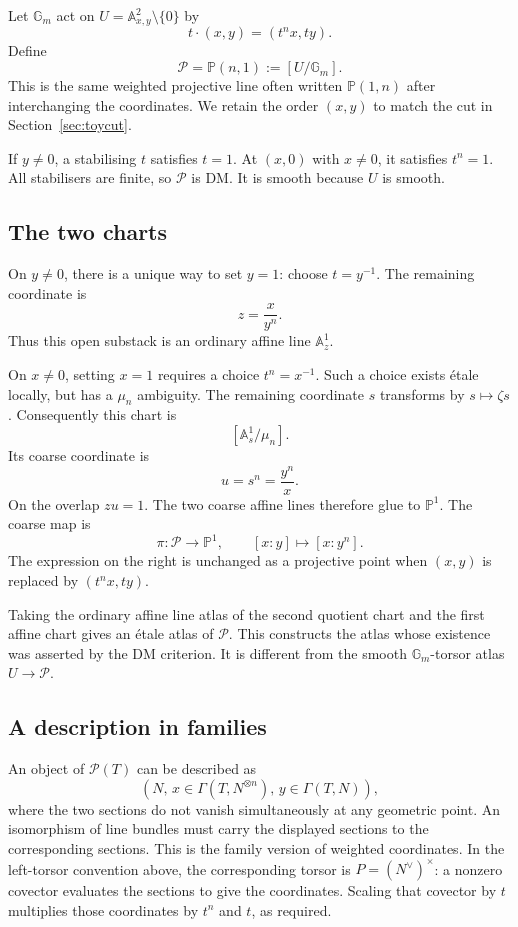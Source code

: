 \documentclass[11pt,a4paper]{article}
\numberwithin{equation}{section}
\theoremstyle{definition}
\newcommand{\A}{\mathbb A}
\newcommand{\PP}{\mathbb P}
\newcommand{\Gm}{\mathbb G_m}
\newcommand{\cP}{\mathcal P}
\begin{document}
Let $\Gm$ act on $U=\A^2_{x,y}\setminus\{0\}$ by
\begin{equation}\label{eq:weightedaction}
 t\cdot(x,y)=(t^n x,t y).
\end{equation}
Define
\[
 \cP=\PP(n,1):=[U/\Gm].
\]
This is the same weighted projective line often written $\PP(1,n)$ after
interchanging the coordinates. We retain the order $(x,y)$ to match the cut
in Section~\ref{sec:toycut}.

If $y\ne0$, a stabilising $t$ satisfies $t=1$. At $(x,0)$ with $x\ne0$,
it satisfies $t^n=1$. All stabilisers are finite, so $\cP$ is DM. It is
smooth because $U$ is smooth.

\subsection{The two charts}
On $y\ne0$, there is a unique way to set $y=1$: choose $t=y^{-1}$. The
remaining coordinate is
\[
 z=\frac{x}{y^n}.
\]
Thus this open substack is an ordinary affine line $\A^1_z$.

On $x\ne0$, setting $x=1$ requires a choice $t^n=x^{-1}$. Such a choice
exists étale locally, but has a $\mu_n$ ambiguity. The remaining coordinate
$s$ transforms by $s\mapsto\zeta s$. Consequently this chart is
\[
 [\A^1_s/\mu_n].
\]
Its coarse coordinate is
\[
 u=s^n=\frac{y^n}{x}.
\]
On the overlap $zu=1$. The two coarse affine lines therefore glue to
$\PP^1$. The coarse map is
\begin{equation}\label{eq:coarseweighted}
 \pi:\cP\longrightarrow\PP^1,\qquad [x:y]\longmapsto[x:y^n].
\end{equation}
The expression on the right is unchanged as a projective point when
$(x,y)$ is replaced by $(t^n x,ty)$.

Taking the ordinary affine line atlas of the second quotient chart and the
first affine chart gives an étale atlas of $\cP$. This constructs the atlas
whose existence was asserted by the DM criterion. It is different from
the smooth $\Gm$-torsor atlas $U\to\cP$.

\subsection{A description in families}
An object of $\cP(T)$ can be described as
\[
 (N,\,x\in\Gamma(T,N^{\otimes n}),\,
        y\in\Gamma(T,N)),
\]
where the two sections do not vanish simultaneously at any geometric point.
An isomorphism of line bundles must carry the displayed sections to the
corresponding sections. This is the family version of weighted coordinates.
In the left-torsor convention above, the corresponding torsor is
$P=(N^\vee)^\times$: a nonzero covector evaluates the sections to give
the coordinates. Scaling that covector by $t$ multiplies those
coordinates by $t^n$ and $t$, as required.
\end{document}
